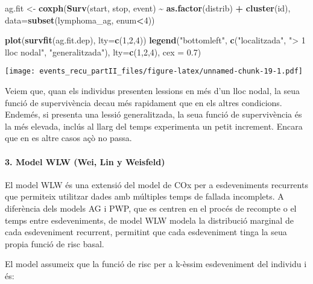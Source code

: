 \documentclass[
]{article}
\newenvironment{Shaded}{\begin{snugshade}}{\end{snugshade}}
\newcommand{\AttributeTok}[1]{\textcolor[rgb]{0.13,0.29,0.53}{#1}}
\newcommand{\DecValTok}[1]{\textcolor[rgb]{0.00,0.00,0.81}{#1}}
\newcommand{\FloatTok}[1]{\textcolor[rgb]{0.00,0.00,0.81}{#1}}
\newcommand{\FunctionTok}[1]{\textcolor[rgb]{0.13,0.29,0.53}{\textbf{#1}}}
\newcommand{\NormalTok}[1]{#1}
\newcommand{\OtherTok}[1]{\textcolor[rgb]{0.56,0.35,0.01}{#1}}
\newcommand{\SpecialCharTok}[1]{\textcolor[rgb]{0.81,0.36,0.00}{\textbf{#1}}}
\newcommand{\StringTok}[1]{\textcolor[rgb]{0.31,0.60,0.02}{#1}}
\begin{document}
\begin{Shaded}
\begin{Highlighting}[]
\NormalTok{ag.fit }\OtherTok{\textless{}{-}} \FunctionTok{coxph}\NormalTok{(}\FunctionTok{Surv}\NormalTok{(start, stop, event) }\SpecialCharTok{\textasciitilde{}} \FunctionTok{as.factor}\NormalTok{(distrib) }\SpecialCharTok{+}
                      \FunctionTok{cluster}\NormalTok{(id), }\AttributeTok{data=}\FunctionTok{subset}\NormalTok{(lymphoma\_ag, enum}\SpecialCharTok{\textless{}}\DecValTok{4}\NormalTok{))}

\FunctionTok{plot}\NormalTok{(}\FunctionTok{survfit}\NormalTok{(ag.fit.dep), }\AttributeTok{lty=}\FunctionTok{c}\NormalTok{(}\DecValTok{1}\NormalTok{,}\DecValTok{2}\NormalTok{,}\DecValTok{4}\NormalTok{)) }
\FunctionTok{legend}\NormalTok{(}\StringTok{"bottomleft"}\NormalTok{, }\FunctionTok{c}\NormalTok{(}\StringTok{"localitzada"}\NormalTok{, }\StringTok{"\textgreater{} 1 lloc nodal"}\NormalTok{, }\StringTok{"generalitzada"}\NormalTok{), }\AttributeTok{lty=}\FunctionTok{c}\NormalTok{(}\DecValTok{1}\NormalTok{,}\DecValTok{2}\NormalTok{,}\DecValTok{4}\NormalTok{), }\AttributeTok{cex =} \FloatTok{0.7}\NormalTok{)}
\end{Highlighting}
\end{Shaded}

\texttt{[image: events\_recu\_partII\_files/figure-latex/unnamed-chunk-19-1.pdf]}

Veiem que, quan els individus presenten lessions en més d'un lloc nodal,
la seua funció de supervivència decau més rapidament que en els altres
condicions. Endemés, si presenta una lessió generalitzada, la seua
funció de supervivència és la més elevada, inclús al llarg del temps
experimenta un petit increment. Encara que en es altre casos açò no
passa.

\paragraph{3. Model WLW (Wei, Lin y
Weisfeld)}\label{model-wlw-wei-lin-y-weisfeld}

El model WLW és una extensió del model de COx per a esdeveniments
recurrents que permiteix utilitzar dades amb múltiples temps de fallada
incomplets. A diferència dels models AG i PWP, que es centren en el
procés de recompte o el temps entre esdeveniments, de model WLW modela
la distribució marginal de cada esdeveniment recurrent, permitint que
cada esdeveniment tinga la seua propia funció de risc basal.

El model assumeix que la funció de risc per a k-èssim esdeveniment del
individu i és:
\end{document}

